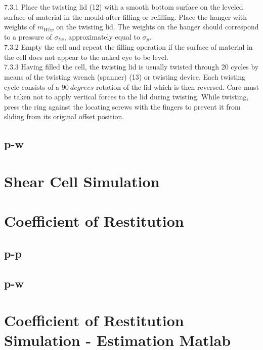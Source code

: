 7.3.1 Place the twisting lid (12) with a smooth bottom surface on the leveled surface of material in the mould after filling or refilling. Place the hanger with weights of $m_{Wtw}$ on the twisting lid. The weights on the hanger should correspond to a pressure of $\sigma_{tw}$, approximately equal to $\sigma_{p}$. \\
7.3.2 Empty the cell and repeat the filling operation if the surface of material in the cell does not appear to the naked eye to be level. \\
7.3.3 Having filled the cell, the twisting lid is usually twisted through 20 cycles by means of the twisting wrench (spanner) (13) or twisting device. Each twisting cycle consists of a $90 ~ degrees$ rotation of the lid which is then reversed. Care must be taken not to apply vertical forces to the lid during twisting. While twisting, press the ring against the locating screws with the fingers to prevent it from sliding from its original offset position.\\

\subsection{p-w}
\label{subsec:JSCTpw}

\lipsum[3]

\section{Shear Cell Simulation}
\label{sec:scsimulation}

\lipsum[1]


\section{Coefficient of Restitution}
\label{sec:COR}

\lipsum[1]

\subsection{p-p}
\label{subsec:CORpp}

\lipsum[2]

\subsection{p-w}
\label{subsec:CORpw}

\lipsum[3]

\section{Coefficient of Restitution Simulation - Estimation Matlab}
\label{sec:corsimulation}

\lipsum[1]
